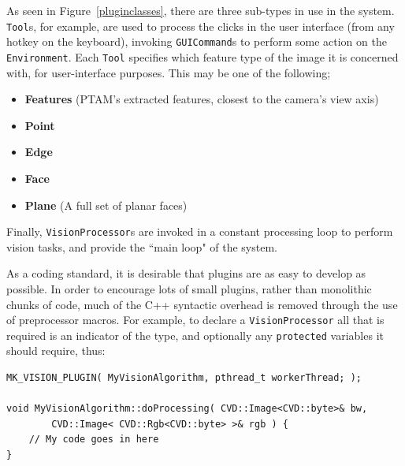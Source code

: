 \documentclass[a4paper,10pt]{article}
\begin{document}
As seen in Figure~\ref{pluginclasses}, there are three sub-types in use in the system. \texttt{Tool}s, for example, are used to process the clicks in the user interface (from any hotkey on the keyboard), invoking \texttt{GUICommand}s to perform some action on the \texttt{Environment}. Each \texttt{Tool} specifies which feature type of the image it is concerned with, for user-interface purposes. This may be one of the following;
\begin{itemize}
\item{\textbf{Features} (PTAM's extracted features, closest to the camera's view axis)}
\item{\textbf{Point}}
\item{\textbf{Edge}}
\item\textbf{{Face}}
\item{\textbf{Plane} (A full set of planar faces)}
\end{itemize}

Finally, \texttt{VisionProcessor}s are invoked in a constant processing loop to perform vision tasks, and provide the ``main loop" of the system.

As a coding standard, it is desirable that plugins are as easy to develop as possible. In order to encourage lots of small plugins, rather than monolithic chunks of code, much of the C++ syntactic overhead is removed through the use of preprocessor macros. For example, to declare a \texttt{VisionProcessor} all that is required is an indicator of the type, and optionally any \texttt{protected} variables it should require, thus:

\begin{verbatim}
MK_VISION_PLUGIN( MyVisionAlgorithm, pthread_t workerThread; );

void MyVisionAlgorithm::doProcessing( CVD::Image<CVD::byte>& bw, 
        CVD::Image< CVD::Rgb<CVD::byte> >& rgb ) {
    // My code goes in here
}
\end{verbatim}
\end{document}
